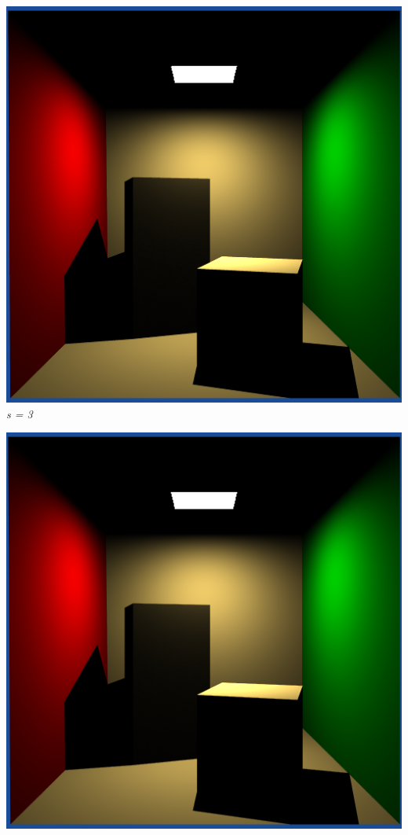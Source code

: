 \documentclass[a4,12pt]{article}
\begin{document}
	\begin{center}
		\begin{minipage}[b]{0.40\linewidth}
			\begin{center}
				\includegraphics[width = \textwidth]{./Worksheet6/cornellblocks3.png}\\
				\textit{s = 3}
			\end{center}
		\end{minipage}
		\hspace{0.05\linewidth}
		\begin{minipage}[b]{0.40\linewidth}
			\begin{center}
				\includegraphics[width = \textwidth]{./Worksheet6/cornellblocks4.png}\\

\end{center}
\end{minipage}
\end{center}
\end{document}

